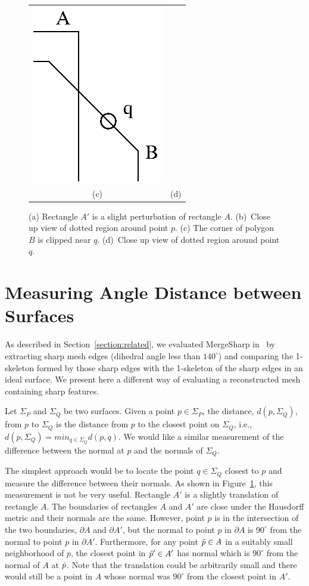 \begin{figure}[t]
\begin{tabular}{cc}
\qquad
\includegraphics[width=0.4\linewidth]{images/polyBclose.eps} \\
(c) & (d)
\end{tabular}

\caption{(a) Rectangle $A'$ is a slight perturbation of rectangle $A$.
(b)~Close up view of dotted region around point $p$.
(c) The corner of polygon $B$ is clipped near $q$.
(d)~Close up view of dotted region around point $q$.}
\label{fig:rect}

\end{figure}


\section{Measuring Angle Distance between Surfaces}
\label{section:angular_distance}

As described in Section~\ref{section:related},
we evaluated MergeSharp in~\cite{bw-cisec-13}
by extracting sharp mesh edges (dihedral angle less than $140^\circ$)
and comparing the 1-skeleton formed
by those sharp edges with the 1-skeleton of the sharp edges 
in an ideal surface.
We present here a different way of evaluating 
a reconstructed mesh containing sharp features.

Let $\Sigma_P$ and $\Sigma_Q$ be two surfaces.
Given a point $p \in \Sigma_P$,
the distance, $d(p,\Sigma_Q)$, from $p$ to $\Sigma_Q$
is the distance from $p$ to the closest point on $\Sigma_Q$,
i.e., $d(p, \Sigma_Q) = min_{q \in \Sigma_Q} d(p,q)$.
We would like a similar measurement of the difference between
the normal at $p$ and the normals of $\Sigma_Q$.

The simplest approach would be to locate the point $q \in \Sigma_Q$
closest to $p$ and measure the difference 
between their normals.
As shown in Figure~\ref{fig:rect},
this measurement is not be very useful.
Rectangle $A'$ is a slightly translation of rectangle $A$.
The boundaries of rectangles $A$ and $A'$
are close under the Hausdorff metric and their normals are the same.
However, point $p$ is in the intersection of the two boundaries,
$\partial A$ and $\partial A'$,
but the normal to point $p$ in $\partial A$ is $90^\circ$
from the normal to point $p$ in $\partial A'$.
Furthermore, for any point $\tilde{p} \in A$ in a suitably small neighborhood of $p$,
the closest point in $\tilde{p}' \in A'$ has normal which is $90^\circ$
from the normal of $A$ at $\tilde{p}$.
Note that the translation could be arbitrarily small
and there would still be a point in $A$ whose normal was $90^\circ$
from the closest point in $A'$.

